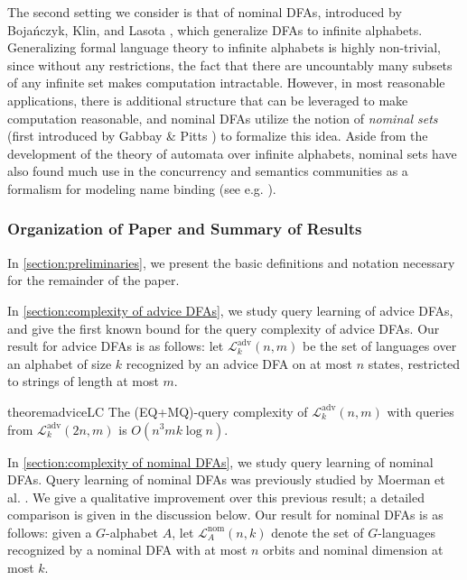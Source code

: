 \documentclass[11pt,a4paper]{amsart}
\theoremstyle{definition}
\newcommand{\mc}{\mathcal}
\begin{document}
The second setting we consider is that of nominal DFAs, introduced by Boja\'nczyk, Klin, and Lasota \cite{bojanczyk-klin-lasota:automata-theory-in-nominal-sets}, which generalize DFAs to infinite alphabets. 
Generalizing formal language theory to infinite alphabets is highly non-trivial, since without any restrictions, the fact that there are uncountably many subsets of any infinite set makes computation intractable.
However, in most reasonable applications, there is additional structure that can be leveraged to make computation reasonable, and nominal DFAs utilize the notion of \textit{nominal sets} (first introduced by Gabbay \& Pitts \cite{gabbay-pitts:new-approach-to-abstract-syntax}) to formalize this idea. 
Aside from the development of the theory of automata over infinite alphabets, nominal sets have also found much use in the concurrency and semantics communities as a formalism for modeling name binding (see e.g. \cite{montanari-pistore:history-dependent-automata-an-introduction,pitts:nominal-sets-names-and-symmetry-in-computer-science}).


\subsubsection{Organization of Paper and Summary of Results}

In \autoref{section:preliminaries}, we present the basic definitions and notation necessary for the remainder of the paper.

In \autoref{section:complexity of advice DFAs}, we study query learning of advice DFAs, and give the first known bound for the query complexity of advice DFAs.
Our result for advice DFAs is as follows: let $\mc L^{\text{adv}}_k(n,m)$ be the set of languages over an alphabet of size $k$ recognized by an advice DFA on at most $n$ states, restricted to strings of length at most $m$.
\begin{restatable*}{theorem}{adviceLC} \label{thm:EQ+MQ learning complexity of DFAs with advice}
    The (EQ+MQ)-query complexity of $\mc L^{\text{adv}}_k(n,m)$ with queries from $\mc L^{\text{adv}}_k(2n,m)$ is $O(n^3mk \log n)$.
\end{restatable*}

In \autoref{section:complexity of nominal DFAs}, we study query learning of nominal DFAs.
Query learning of nominal DFAs was previously studied by Moerman et al. \cite{moerman-etal:learning-nominal-automata}.
We give a qualitative improvement over this previous result; a detailed comparison is given in the discussion below.
Our result for nominal DFAs is as follows: given a $G$-alphabet $A$, let $\mc L^{\text{nom}}_A(n,k)$ denote the set of $G$-languages recognized by a nominal DFA with at most $n$ orbits and nominal dimension at most $k$.
\end{document}
